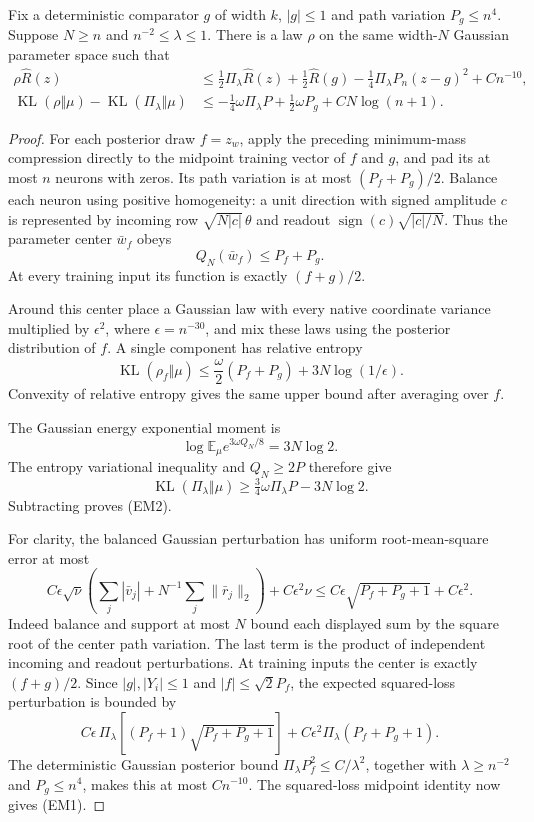 \begin{lemma}
\label{lem:empirical-midpoint-law}
Fix a deterministic comparator $g$ of width $k$, $|g|\le1$ and
path variation $P_g\le n^4$. Suppose $N\ge n$ and
$n^{-2}\le\lambda\le1$. There is a law $\rho$ on the same
width-$N$ Gaussian parameter space such that
\begin{align}
 \rho\widehat R(z)
 &\le\tfrac12\Pi_\lambda\widehat R(z)
       +\tfrac12\widehat R(g)
       -\tfrac14\Pi_\lambda P_n(z-g)^2+Cn^{-10}, \tag{EM1}\\
 \operatorname{KL}(\rho\Vert\mu)
       -\operatorname{KL}(\Pi_\lambda\Vert\mu)
 &\le-\tfrac14\omega\Pi_\lambda P
       +\tfrac12\omega P_g+CN\log(n+1). \tag{EM2}
\end{align}
\end{lemma}
\begin{proof}
For each posterior draw $f=z_w$, apply the preceding minimum-mass
compression directly to the midpoint training vector of $f$ and $g$,
and pad its at most $n$ neurons with zeros. Its path variation is
at most $(P_f+P_g)/2$.
Balance each neuron using positive homogeneity: a unit direction
with signed amplitude $c$ is represented by incoming row
$\sqrt{N|c|}\,\theta$ and readout
$\operatorname{sign}(c)\sqrt{|c|/N}$.
Thus the parameter center $\bar w_f$ obeys
\[
 Q_N(\bar w_f)\le P_f+P_g.
\]
At every training input its function is exactly $(f+g)/2$.

Around this center place a Gaussian law with every native
coordinate variance multiplied by $\epsilon^2$, where
$\epsilon=n^{-30}$, and mix these laws using the posterior
distribution of $f$. A single component has relative entropy
\[
 \operatorname{KL}(\rho_f\Vert\mu)
 \le\frac{\omega}{2}(P_f+P_g)+3N\log(1/\epsilon).
\]
Convexity of relative entropy gives the same upper bound after
averaging over $f$.

The Gaussian energy exponential moment is
\[
 \log\mathbb E_\mu e^{3\omega Q_N/8}=3N\log2.
\]
The entropy variational inequality and $Q_N\ge2P$ therefore give
\[
 \operatorname{KL}(\Pi_\lambda\Vert\mu)
 \ge\tfrac34\omega\Pi_\lambda P-3N\log2.
\]
Subtracting proves (EM2).

For clarity, the balanced Gaussian perturbation has uniform
root-mean-square error at most
\[
 C\epsilon\sqrt\nu
 \left(\sum_j|\bar v_j|+N^{-1}\sum_j\|\bar r_j\|_2\right)
 +C\epsilon^2\nu
 \le C\epsilon\sqrt{P_f+P_g+1}+C\epsilon^2.
\]
Indeed balance and support at most $N$ bound each displayed sum
by the square root of the center path variation. The last term
is the product of independent incoming and readout perturbations.
At training inputs the center is exactly $(f+g)/2$.
Since $|g|,|Y_i|\le1$ and $|f|\le\sqrt2P_f$, the expected
squared-loss perturbation is bounded by
\[
 C\epsilon\,\Pi_\lambda
       [(P_f+1)\sqrt{P_f+P_g+1}]
       +C\epsilon^2\Pi_\lambda(P_f+P_g+1).
\]
The deterministic Gaussian posterior bound
$\Pi_\lambda P_f^2\le C/\lambda^2$, together with
$\lambda\ge n^{-2}$ and $P_g\le n^4$, makes this at most
$Cn^{-10}$. The squared-loss midpoint identity now gives (EM1).
\end{proof}

